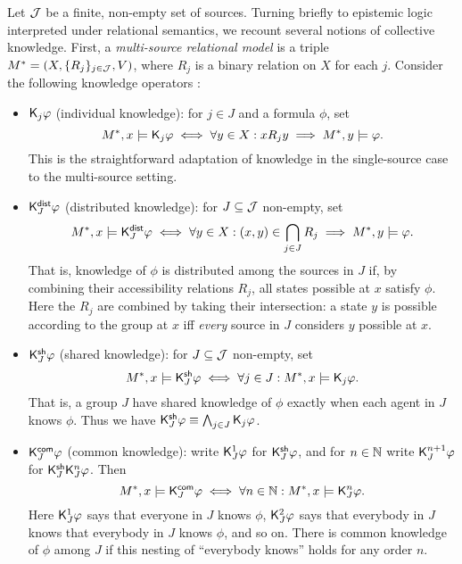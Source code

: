 Let $\mathcal{J}$ be a finite, non-empty set of sources. Turning briefly to epistemic
logic interpreted under relational semantics, we recount several notions of
collective knowledge. First, a \emph{multi-source relational model} is a triple
$M^* = (X, \{R_j\}_{j \in \mathcal{J}}, V)$, where $R_j$ is a binary relation on $X$ for
each $j$. Consider the following knowledge operators \cite{fagin2003reasoning}:

\begin{itemize}
\item $\mathsf{K}_j\varphi$ (individual knowledge): for $j \in J$ and a formula
$\phi$, set
    \[
    M^*, x \models \mathsf{K}_j\varphi
\iff
\forall y \in X: x{R_j}y \implies M^*, y \models \varphi.\]
    This is the straightforward adaptation of knowledge in the single-source case
to the multi-source setting.

    \item $\mathsf{K}^{\mathsf{dist}}_J\varphi$ (distributed knowledge): for $J \subseteq \mathcal{J}$
non-empty, set
    \[
    M^*, x \models \mathsf{K}^{\mathsf{dist}}_J\varphi
\iff
\forall y \in X: (x, y) \in \bigcap_{j \in J}{R_j}
    \implies M^*, y \models \varphi.\]
    That is, knowledge of $\phi$ is distributed among the sources in
$J$ if, by combining their accessibility relations $R_j$, all
states possible at $x$ satisfy $\phi$. Here the $R_j$ are
combined by taking their intersection: a state $y$ is possible
according to the group at $x$ iff \emph{every} source in $J$ considers
$y$ possible at $x$.

    \item $\mathsf{K}^{\mathsf{sh}}_J\varphi$ (shared knowledge):\footnotemark{} for $J \subseteq
      \mathcal{J}$ non-empty, set
    \[
    M^*, x \models \mathsf{K}^{\mathsf{sh}}_J\varphi
\iff
\forall j \in J: M^*, x \models \mathsf{K}_j\varphi.\]
    That is, a group $J$ have shared knowledge of $\phi$ exactly when
each agent in $J$ knows $\phi$. Thus we have
$\mathsf{K}^{\mathsf{sh}}_J\varphi \equiv \bigwedge_{j \in J}\mathsf{K}_j\varphi$.


    \item $\mathsf{K}^{\mathsf{com}}_J\varphi$ (common knowledge): write $\mathsf{K}_J^1\varphi$ for
$\mathsf{K}^{\mathsf{sh}}_J\varphi$, and for $n \in \mathbb{N}$ write $\mathsf{K}_J^{n +
1}\varphi$ for $\mathsf{K}^{\mathsf{sh}}_J\mathsf{K}_J^n\varphi$. Then
    \[
    M^*, x \models \mathsf{K}^{\mathsf{com}}_J\varphi
\iff
\forall n \in \mathbb{N}: M^*, x \models \mathsf{K}_J^n\varphi.\]
    Here $\mathsf{K}_J^1\varphi$ says that everyone in $J$ knows $\phi$,
$\mathsf{K}_J^2\varphi$ says that everybody in $J$ knows that everybody in
$J$ knows $\phi$, and so on. There is common knowledge of
$\phi$ among $J$ if this nesting of ``everybody knows'' holds for
any order $n$.

    \end{itemize}

